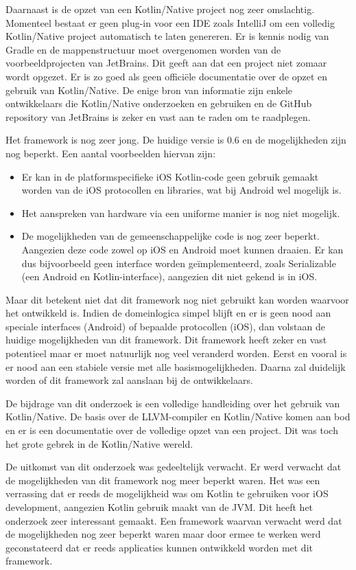 Daarnaast is de opzet van een Kotlin/Native project nog zeer omslachtig. Momenteel bestaat er geen plug-in voor een IDE zoals IntelliJ om een volledig Kotlin/Native project automatisch te laten genereren. Er is kennis nodig van Gradle en de mappenstructuur moet overgenomen worden van de voorbeeldprojecten van JetBrains. Dit geeft aan dat een project niet zomaar wordt opgezet. Er is zo goed als geen officiële documentatie over de opzet en gebruik van Kotlin/Native. De enige bron van informatie zijn enkele ontwikkelaars die Kotlin/Native onderzoeken en gebruiken en de GitHub repository van JetBrains is zeker en vast aan te raden om te raadplegen.

Het framework is nog zeer jong. De huidige versie is 0.6 en de mogelijkheden zijn nog beperkt. Een aantal voorbeelden hiervan zijn:
\begin{itemize}
	\item Er kan in de platformspecifieke iOS Kotlin-code geen gebruik gemaakt worden van de iOS protocollen en libraries, wat bij Android wel mogelijk is.
	\item Het aanspreken van hardware via een uniforme manier is nog niet mogelijk.
	\item De mogelijkheden van de gemeenschappelijke code is nog zeer beperkt. Aangezien deze code zowel op iOS en Android moet kunnen draaien. Er kan dus bijvoorbeeld geen interface worden geïmplementeerd, zoals Serializable (een Android en Kotlin-interface), aangezien dit niet gekend is in iOS.
\end{itemize}

Maar dit betekent niet dat dit framework nog niet gebruikt kan worden waarvoor het ontwikkeld is. Indien de domeinlogica simpel blijft en er is geen nood aan speciale interfaces (Android) of bepaalde protocollen (iOS), dan volstaan de huidige mogelijkheden van dit framework. Dit framework heeft zeker en vast potentieel maar er moet natuurlijk nog veel veranderd worden. Eerst en vooral is er nood aan een stabiele versie met alle basismogelijkheden. Daarna zal duidelijk worden of dit framework zal aanslaan bij de ontwikkelaars.

De bijdrage van dit onderzoek is een volledige handleiding over het gebruik van Kotlin/Native. De basis over de LLVM-compiler en Kotlin/Native komen aan bod en er is een documentatie over de volledige opzet van een project. Dit was toch het grote gebrek in de Kotlin/Native wereld.

De uitkomst van dit onderzoek was gedeeltelijk verwacht. Er werd verwacht dat de mogelijkheden van dit framework nog meer beperkt waren. Het was een verrassing dat er reeds de mogelijkheid was om Kotlin te gebruiken voor iOS development, aangezien Kotlin gebruik maakt van de JVM. Dit heeft het onderzoek zeer interessant gemaakt. Een framework waarvan verwacht werd dat de mogelijkheden nog zeer beperkt waren maar door ermee te werken werd geconstateerd dat er reeds applicaties kunnen ontwikkeld worden met dit framework. 

